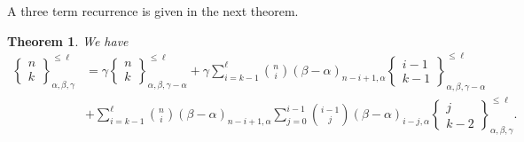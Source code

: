 \documentclass[12pt, reqno]{amsart}
\newtheorem{proof 1}{proof 1}
\newtheorem{theorem}{Theorem}[section]
\def\sts#1#2{\begin{Bmatrix}
#1 \\ #2 \end{Bmatrix}}
\begin{document}
A three term recurrence is given in the next theorem.
\begin{theorem} We have
\begin{align*}
\sts{n}{k}_{\alpha,\beta, \gamma}^{\leq \ell} &= \gamma\sts{n}{k}_{\alpha,\beta,\gamma-\alpha}^{\leq \ell} + \gamma\sum_{i=k-1}^{\ell}\binom{n}{i}(\beta-\alpha)_{n-i+1,\alpha}\sts{i-1}{k-1}_{\alpha, \beta, \gamma-\alpha}^{\leq \ell}\\&+ \sum_{i=k-1}^{\ell} \binom{n}{i}(\beta-\alpha)_{n-i+1, \alpha}\sum_{j=0}^{i-1}\binom{i-1}{j}(\beta-\alpha)_{i-j,\alpha}\sts{j}{k-2}_{\alpha,\beta,\gamma}^{\leq \ell}.
\end{align*}
\end{theorem}
\end{document}
